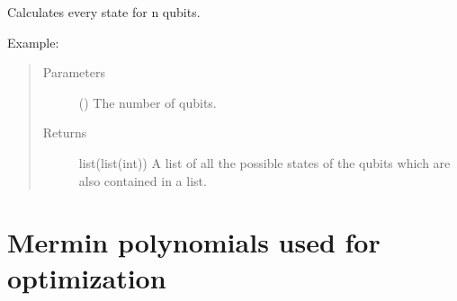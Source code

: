 \documentclass[letterpaper,10pt,english]{sphinxmanual}
\begin{document}
\begin{fulllineitems}
\label{\detokenize{hypergraphstates-opti:mermin_on_qiskit.hypergraphstates_optimization.hypergraphstates.states_formation}}
Calculates every state for n qubits.
\begin{description}
\item[{Example:}] \leavevmode
\begin{sphinxVerbatim}[commandchars=\\\{\}]
\end{sphinxVerbatim}

\end{description}
\begin{quote}\begin{description}
\item[{Parameters}] \leavevmode
{} () \textendash{} The number of qubits.

\item[{Returns}] \leavevmode
list(list(int)) \textendash{} A list of all the possible states of the qubits 
which are also contained in a list.

\end{description}\end{quote}

\end{fulllineitems}



\chapter{Mermin polynomials used for optimization}
\label{\detokenize{mermin_polynomials-opti:module-mermin_on_qiskit.hypergraphstates_optimization.mermin_polynomials}}\label{\detokenize{mermin_polynomials-opti:mermin-polynomials-used-for-optimization}}\label{\detokenize{mermin_polynomials-opti::doc}}
\end{document}

